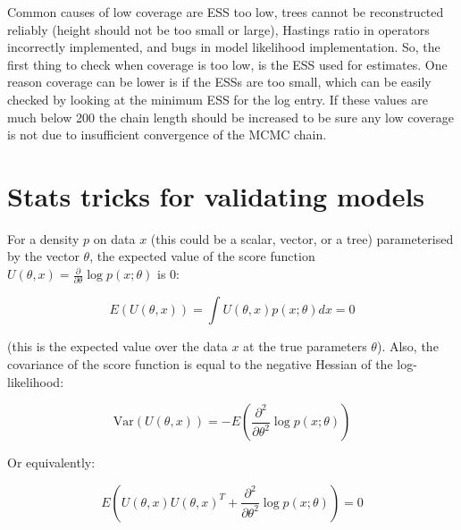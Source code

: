 \documentclass[oneside]{article}
\begin{document}
Common causes of low coverage are ESS too low,
trees cannot be reconstructed reliably (height should not be too small or large),
Hastings ratio in operators incorrectly implemented, and
bugs in model likelihood implementation.
So, the first thing to check when coverage is too low, is the ESS used for
estimates.
One reason coverage can be lower is if the ESSs are too small, which can
be easily checked by looking at the minimum ESS for the log entry. If
these values are much below 200 the chain length should be increased to
be sure any low coverage is not due to insufficient convergence of the
MCMC chain.




\vspace{1cm}


\vspace{1cm}







\section{Stats tricks for validating models}


For a density $p$ on data $x$ (this could be a scalar, vector, or a tree) parameterised by the vector $\theta$, the expected value of the score function $U(\theta,x)=\frac{\partial}{\partial\theta}\log p(x;\theta)$ is 0:

\begin{equation}\label{eq:scorefunction}
E(U(\theta,x)) = \int U(\theta,x)p(x;\theta)dx = 0
\end{equation}

(this is the expected value over the data $x$ at the true parameters $\theta$). Also, the covariance of the score function is equal to the negative Hessian of the log-likelihood:

$$
\textrm{Var}(U(\theta, x))=-E\left(\frac{\partial^2}{\partial\theta^2}\log p(x;\theta)\right)
$$

Or equivalently:

\begin{equation}\label{eq:variancestatistic}
E\left(U(\theta, x)U(\theta, x)^T + \frac{\partial^2}{\partial\theta^2}\log p(x;\theta)\right)=0 
\end{equation}
\end{document}
